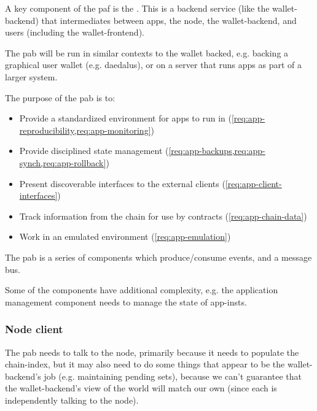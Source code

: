 \medskip

A key component of the \gls{paf} is the .
This is a backend service (like the \gls{wallet-backend}) that intermediates between \glspl{app}, the \gls{node}, the \gls{wallet-backend}, and users (including the \gls{wallet-frontend}).

The \gls{pab} will be run in similar contexts to the wallet backed, e.g. backing a graphical user wallet (e.g. \gls{daedalus}), or on a server that runs \glspl{app} as part of a larger system.

The purpose of the \gls{pab} is to:
\begin{itemize}
\item Provide a standardized environment for \glspl{app} to run in (\cref{req:app-reproducibility,req:app-monitoring})
\item Provide disciplined state management (\cref{req:app-backups,req:app-synch,req:app-rollback})
\item Present discoverable interfaces to the external clients (\cref{req:app-client-interfaces})
\item Track information from the chain for use by contracts (\cref{req:app-chain-data})
\item Work in an emulated environment (\cref{req:app-emulation})
\end{itemize}

The \gls{pab} is a series of components which produce/consume events, and a message bus.

Some of the components have additional complexity, e.g. the application management component needs to manage the state of \glspl{app-inst}.

\subsubsection{Node client}
The \gls{pab} needs to talk to the \gls{node}, primarily because it needs to populate the \gls{chain-index}, but it may also need to do some things that appear to be the \gls{wallet-backend}'s job (e.g. maintaining pending sets), because we can't guarantee that the \gls{wallet-backend}'s view of the world will match our own (since each is independently talking to the \gls{node}).

